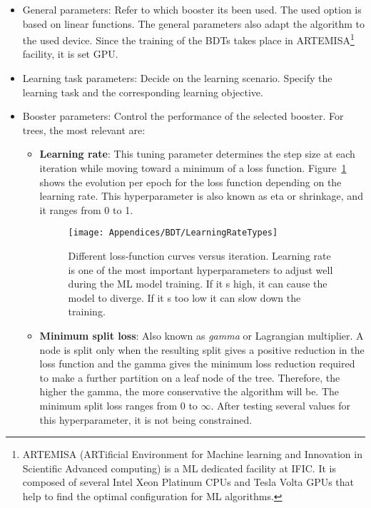 \begin{itemize}
	\item General parameters: Refer to which booster its been used. The used option is based on linear functions. %
	The general parameters also adapt the algorithm to the used device.
	Since the training of the BDTs takes place in ARTEMISA\footnote{ARTEMISA (ARTificial Environment for Machine 
	learning and Innovation in Scientific Advanced computing) is a ML dedicated facility at IFIC. It is composed of 
	several Intel Xeon Platinum CPUs and Tesla Volta GPUs that help to find the optimal configuration for ML algorithms.} 
	facility, it is set GPU.					%
	\item Learning task parameters: Decide on the learning scenario. Specify the learning task 
	and the corresponding learning objective.
	\item Booster parameters: Control the performance of the selected booster. 
	For trees, the most relevant are: 
	\begin{itemize} %
		\item \textbf{Learning rate}: 
		This tuning parameter %
		determines the step size at each iteration while moving toward a minimum of a loss function.
		Figure~\ref{fig:Appendix:BDT:LearingRateTypes} shows the evolution per epoch for the loss function
		depending on the learning rate. This hyperparameter is also known as eta or shrinkage, and it ranges from 0 to 1.
			\begin{figure}[h]
			\centering
  			\centering
  			\texttt{[image: Appendices/BDT/LearningRateTypes]}
			\caption{Different loss-function curves versus iteration.
			Learning rate is one of the most important hyperparameters to adjust well during the ML model training. 
			If it s high, it can cause the model to diverge. If it s too low it can slow down the training.}
			\label{fig:Appendix:BDT:LearingRateTypes}
		\end{figure}
		
		\item \textbf{Minimum split loss}: 
		Also known as \textit{gamma} or Lagrangian multiplier.  
		A node is split only when the resulting split gives a positive reduction in the loss function
		and the gamma gives the minimum loss reduction required to make a further partition
		 on a leaf node of the tree. Therefore, the higher the gamma, the more conservative the algorithm
		 will be. The minimum split loss ranges from 0 to $\infty$. 
		 After testing several values for this hyperparameter, it is not being constrained.
		

\end{itemize}
\end{itemize}
